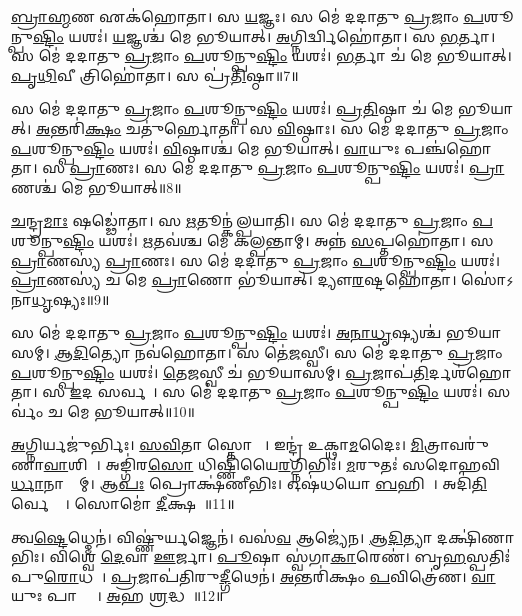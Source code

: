\ul{𑌬𑍍𑌰𑌾}\ul{𑌹𑍍𑌮}𑌣 𑌏𑌕॑𑌹𑍋𑌤𑌾। 
𑌸 \ul{𑌯}𑌜𑍍𑌞𑌃। 
𑌸 𑌮𑍇॑ 𑌦𑌦𑌾𑌤𑍁 \ul{𑌪𑍍𑌰}𑌜𑌾𑌂 \ul{𑌪}𑌶𑍂𑌨𑍍𑌪𑍁\ul{𑌷𑍍𑌟𑌿𑌂} 𑌯𑌶𑌃॑। 
\ul{𑌯}𑌜𑍍𑌞𑌶𑍍𑌚॑ 𑌮𑍇 𑌭𑍂𑌯𑌾𑌤𑍍। 
\ul{𑌅}𑌗𑍍𑌨𑌿𑌰𑍍𑌦𑍍𑌵𑌿𑌹𑍋॑𑌤𑌾। 
𑌸 \ul{𑌭}𑌰𑍍𑌤𑌾। 
𑌸 𑌮𑍇॑ 𑌦𑌦𑌾𑌤𑍁 \ul{𑌪𑍍𑌰}𑌜𑌾𑌂 \ul{𑌪}𑌶𑍂𑌨𑍍𑌪𑍁\ul{𑌷𑍍𑌟𑌿𑌂} 𑌯𑌶𑌃॑। 
\ul{𑌭}𑌰𑍍𑌤𑌾 𑌚॑ 𑌮𑍇 𑌭𑍂𑌯𑌾𑌤𑍍। 
\ul{𑌪𑍃}\ul{𑌥𑌿}𑌵𑍀 𑌤𑍍𑌰𑌿𑌹𑍋॑𑌤𑌾। 
𑌸 𑌪𑍍𑌰॑\ul{𑌤𑌿}𑌷𑍍𑌠𑌾॥7॥

𑌸 𑌮𑍇॑ 𑌦𑌦𑌾𑌤𑍁 \ul{𑌪𑍍𑌰}𑌜𑌾𑌂 \ul{𑌪}𑌶𑍂𑌨𑍍𑌪𑍁\ul{𑌷𑍍𑌟𑌿𑌂} 𑌯𑌶𑌃॑। 
\ul{𑌪𑍍𑌰}\ul{𑌤𑌿}𑌷𑍍𑌠𑌾 𑌚॑ 𑌮𑍇 𑌭𑍂𑌯𑌾𑌤𑍍। 
\ul{𑌅}𑌨𑍍𑌤𑌰𑌿॑\ul{𑌕𑍍𑌷𑌂} 𑌚𑌤𑍁॑𑌰𑍍\mbox{}𑌹𑍋𑌤𑌾। 
𑌸 \ul{𑌵𑌿}𑌷𑍍𑌠𑌾𑌃। 
𑌸 𑌮𑍇॑ 𑌦𑌦𑌾𑌤𑍁 \ul{𑌪𑍍𑌰}𑌜𑌾𑌂 \ul{𑌪}𑌶𑍂𑌨𑍍𑌪𑍁\ul{𑌷𑍍𑌟𑌿𑌂} 𑌯𑌶𑌃॑। 
\ul{𑌵𑌿}𑌷𑍍𑌠𑌾𑌶𑍍𑌚॑ 𑌮𑍇 𑌭𑍂𑌯𑌾𑌤𑍍। 
\ul{𑌵𑌾}𑌯𑍁𑌃 𑌪𑌞𑍍𑌚॑𑌹𑍋𑌤𑌾। 
𑌸 \ul{𑌪𑍍𑌰𑌾}𑌣𑌃। 
𑌸 𑌮𑍇॑ 𑌦𑌦𑌾𑌤𑍁 \ul{𑌪𑍍𑌰}𑌜𑌾𑌂 \ul{𑌪}𑌶𑍂𑌨𑍍𑌪𑍁\ul{𑌷𑍍𑌟𑌿𑌂} 𑌯𑌶𑌃॑। 
\ul{𑌪𑍍𑌰𑌾}𑌣𑌶𑍍𑌚॑ 𑌮𑍇 𑌭𑍂𑌯𑌾𑌤𑍍॥8॥

\ul{𑌚}𑌨𑍍𑌦𑍍𑌰\ul{𑌮𑌾𑌃} 𑌷𑌡𑍍𑌢𑍋॑𑌤𑌾। 
𑌸 \ul{𑌋}𑌤𑍂𑌨𑍍𑌕॑𑌲𑍍𑌪𑌯𑌾𑌤𑌿। 
𑌸 𑌮𑍇॑ 𑌦𑌦𑌾𑌤𑍁 \ul{𑌪𑍍𑌰}𑌜𑌾𑌂 \ul{𑌪}𑌶𑍂𑌨𑍍𑌪𑍁\ul{𑌷𑍍𑌟𑌿𑌂} 𑌯𑌶𑌃॑। 
\ul{𑌋}𑌤𑌵॑𑌶𑍍𑌚 𑌮𑍇 𑌕𑌲𑍍𑌪𑌨𑍍𑌤𑌾𑌮𑍍। 
𑌅𑌨𑍍𑌨॑ \ul{𑌸}𑌪𑍍𑌤𑌹𑍋॑𑌤𑌾। 
𑌸 \ul{𑌪𑍍𑌰𑌾}𑌣𑌸𑍍𑌯॑ \ul{𑌪𑍍𑌰𑌾}𑌣𑌃। 
𑌸 𑌮𑍇॑ 𑌦𑌦𑌾𑌤𑍁 \ul{𑌪𑍍𑌰}𑌜𑌾𑌂 \ul{𑌪}𑌶𑍂𑌨𑍍𑌪𑍁\ul{𑌷𑍍𑌟𑌿𑌂} 𑌯𑌶𑌃॑। 
\ul{𑌪𑍍𑌰𑌾}𑌣𑌸𑍍𑌯॑ 𑌚 𑌮𑍇 \ul{𑌪𑍍𑌰𑌾}𑌣𑍋 𑌭𑍂॑𑌯𑌾𑌤𑍍। 
𑌦𑍍𑌯𑍗\ul{𑌰}𑌷𑍍𑌟𑌹𑍋॑𑌤𑌾। 
𑌸𑍋॑𑌽𑌨𑌾\ul{𑌧𑍃}𑌷𑍍𑌯𑌃॥9॥

𑌸 𑌮𑍇॑ 𑌦𑌦𑌾𑌤𑍁 \ul{𑌪𑍍𑌰}𑌜𑌾𑌂 \ul{𑌪}𑌶𑍂𑌨𑍍𑌪𑍁\ul{𑌷𑍍𑌟𑌿𑌂} 𑌯𑌶𑌃॑। 
\ul{𑌅}\ul{𑌨𑌾}\ul{𑌧𑍃}𑌷𑍍𑌯𑌶𑍍𑌚॑ 𑌭𑍂𑌯𑌾𑌸𑌮𑍍। 
\ul{𑌆}\ul{𑌦𑌿}𑌤𑍍𑌯𑍋 𑌨𑌵॑𑌹𑍋𑌤𑌾। 
𑌸 𑌤𑍇॑\ul{𑌜}𑌸𑍍𑌵𑍀। 
𑌸 𑌮𑍇॑ 𑌦𑌦𑌾𑌤𑍁 \ul{𑌪𑍍𑌰}𑌜𑌾𑌂 \ul{𑌪}𑌶𑍂𑌨𑍍𑌪𑍁\ul{𑌷𑍍𑌟𑌿𑌂} 𑌯𑌶𑌃॑। 
\ul{𑌤𑍇}\ul{𑌜}𑌸𑍍𑌵𑍀 𑌚॑ 𑌭𑍂𑌯𑌾𑌸𑌮𑍍। 
\ul{𑌪𑍍𑌰}𑌜𑌾𑌪॑\ul{𑌤𑌿}𑌰𑍍𑌦𑌶॑𑌹𑍋𑌤𑌾। 
𑌸 \ul{𑌇}𑌦 𑌸𑌰𑍍𑌵𑌮𑍍᳚। 
𑌸 𑌮𑍇॑ 𑌦𑌦𑌾𑌤𑍁 \ul{𑌪𑍍𑌰}𑌜𑌾𑌂 \ul{𑌪}𑌶𑍂𑌨𑍍𑌪𑍁\ul{𑌷𑍍𑌟𑌿𑌂} 𑌯𑌶𑌃॑। 
𑌸𑌰𑍍𑌵𑌂॑ 𑌚 𑌮𑍇 𑌭𑍂𑌯𑌾𑌤𑍍॥10॥
\anuvakamend[\ul{𑌪𑍍𑌰}\ul{𑌤𑌿}𑌷𑍍𑌠𑌾 \ul{𑌪𑍍𑌰𑌾}𑌣𑌶𑍍𑌚॑ 𑌮𑍇 𑌭𑍂𑌯𑌾𑌦𑌨𑌾\ul{𑌧𑍃}𑌷𑍍𑌯𑌃 𑌸𑌰𑍍𑌵𑌂॑ 𑌚 𑌮𑍇 𑌭𑍂𑌯𑌾𑌤𑍍]

\ul{𑌅}𑌗𑍍𑌨𑌿𑌰𑍍𑌯𑌜𑍁॑𑌰𑍍𑌭𑌿𑌃। 
\ul{𑌸}\ul{𑌵𑌿}𑌤𑌾 𑌸𑍍𑌤𑍋𑌮𑍈𑌃᳚। 
𑌇𑌨𑍍𑌦𑍍𑌰॑ 𑌉𑌕𑍍𑌥𑌾\ul{𑌮}𑌦𑍈𑌃। 
\ul{𑌮𑌿}𑌤𑍍𑌰𑌾𑌵𑌰𑍁॑𑌣𑌾\-\ul{𑌵𑌾}𑌶𑌿𑌷𑌾᳚। 
𑌅𑌙𑍍𑌗𑌿॑𑌰\ul{𑌸𑍋} 𑌧𑌿𑌷𑍍𑌣𑌿॑𑌯𑍈\ul{𑌰}𑌗𑍍𑌨𑌿𑌭𑌿𑌃॑। 
\ul{𑌮}𑌰𑍁𑌤𑌃॑ 𑌸𑌦𑍋𑌹𑌵𑌿\ul{𑌰𑍍𑌧𑌾}𑌨𑌾𑌭𑍍𑌯𑌾᳚𑌮𑍍। 
𑌆\ul{𑌪𑌃} 𑌪𑍍𑌰𑍋𑌕𑍍𑌷॑𑌣𑍀𑌭𑌿𑌃। 
𑌓𑌷॑𑌧𑌯𑍋 \ul{𑌬}\ar{}𑌹𑌿𑌷𑌾᳚। 
𑌅𑌦𑌿॑\ul{𑌤𑌿}𑌰𑍍𑌵𑍇𑌦𑍍𑌯𑌾᳚। 
𑌸𑍋𑌮𑍋॑ \ul{𑌦𑍀}𑌕𑍍𑌷𑌯𑌾᳚॥11॥

𑌤𑍍𑌵\ul{𑌷𑍍𑌟𑍇}𑌧𑍍𑌮𑍇𑌨॑। 
𑌵𑌿𑌷𑍍𑌣𑍁॑𑌰𑍍\mbox{}\ul{𑌯}𑌜𑍍𑌞𑍇𑌨॑। 
𑌵𑌸॑\ul{𑌵} 𑌆𑌜𑍍𑌯𑍇॑𑌨। 
\ul{𑌆}\ul{𑌦𑌿}𑌤𑍍𑌯𑌾 𑌦𑌕𑍍𑌷𑌿॑𑌣𑌾𑌭𑌿𑌃। 
𑌵𑌿𑌶𑍍𑌵𑍇॑ \ul{𑌦𑍇}𑌵𑌾 \ul{𑌊}𑌰𑍍𑌜𑌾। 
\ul{𑌪𑍂}𑌷𑌾 𑌸𑍍𑌵॑𑌗𑌾\ul{𑌕𑌾}𑌰𑍇𑌣॑। 
𑌬𑍃\ul{𑌹}𑌸𑍍𑌪𑌤𑌿𑌃॑ 𑌪𑍁\ul{𑌰𑍋}𑌧𑌯𑌾᳚। 
\ul{𑌪𑍍𑌰}𑌜𑌾𑌪॑𑌤𑌿𑌰𑍁\ul{𑌦𑍍𑌗𑍀}𑌥𑍇𑌨॑। 
\ul{𑌅}𑌨𑍍𑌤𑌰𑌿॑𑌕𑍍𑌷𑌂 \ul{𑌪}𑌵𑌿𑌤𑍍𑌰𑍇॑𑌣। 
\ul{𑌵𑌾}𑌯𑍁𑌃 𑌪𑌾𑌤𑍍𑌰𑍈𑌃᳚। 
\ul{𑌅}𑌹 \ul{𑌶𑍍𑌰}𑌦𑍍𑌧𑌯𑌾᳚॥12॥
\anuvakamend[\ul{𑌦𑍀}𑌕𑍍𑌷\ul{𑌯𑌾} 𑌪𑌾\ul{𑌤𑍍𑌰𑍈}𑌰𑍇𑌕𑌂॑ 𑌚]

